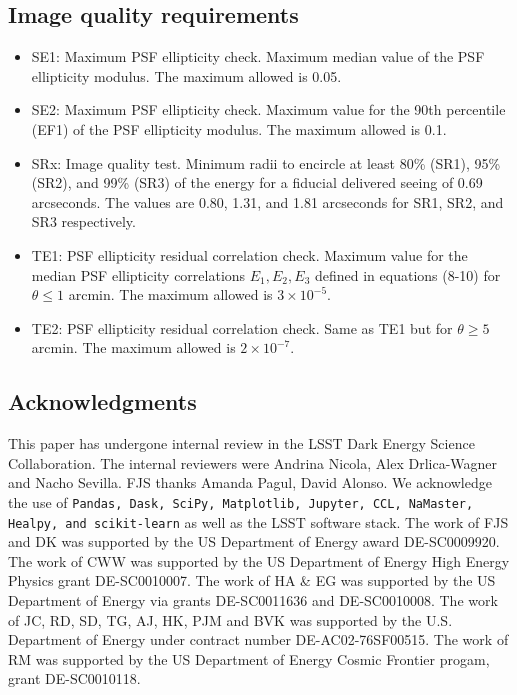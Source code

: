 \documentclass[\docopts]{\docclass}
\begin{document}
\subsection{Image quality requirements}
\begin{itemize}

\item SE1: Maximum PSF ellipticity check. Maximum median value of the PSF ellipticity modulus. The maximum allowed is 0.05.
\item SE2: Maximum PSF ellipticity check. Maximum value for the 90th percentile (EF1) of the PSF ellipticity modulus. The maximum allowed is 0.1.
\item SRx: Image quality test. Minimum radii to encircle at least 80\% (SR1), 95\% (SR2), and 99\% (SR3) of the energy for a fiducial delivered seeing of 0.69 arcseconds. The values are 0.80, 1.31, and 1.81 arcseconds for SR1, SR2, and SR3 respectively.
\item TE1: PSF ellipticity residual correlation check. Maximum value for the median PSF ellipticity correlations $E_{1}, E_{2}, E_{3}$ defined in equations (8-10) for $\theta \leq 1$ arcmin. The maximum allowed is $3 \times 10^{-5}$.
\item TE2: PSF ellipticity residual correlation check. Same as TE1 but for $\theta \geq 5$ arcmin. The maximum allowed is $2 \times 10^{-7}$. 
\end{itemize}
\subsection*{Acknowledgments}
This paper has undergone internal review in the LSST Dark Energy Science Collaboration. The internal reviewers were Andrina Nicola, Alex Drlica-Wagner and Nacho Sevilla.
FJS thanks Amanda Pagul, David Alonso. We acknowledge the use of \texttt{Pandas, Dask, SciPy, Matplotlib, Jupyter, CCL, \texttt{NaMaster}, Healpy, and scikit-learn} as well as the LSST software stack.
The work of FJS and DK was supported by the US Department of Energy award DE-SC0009920. The work of CWW was supported by the US Department of Energy High Energy Physics grant DE-SC0010007. The work of HA \& EG was supported by the US Department of Energy via grants DE-SC0011636 and DE-SC0010008. The work of JC, RD, SD, TG, AJ, HK, PJM and BVK was supported by the U.S. Department of Energy under contract number DE-AC02-76SF00515. The work of RM was supported by the US Department of Energy Cosmic Frontier progam, grant DE-SC0010118. 







\end{document}
